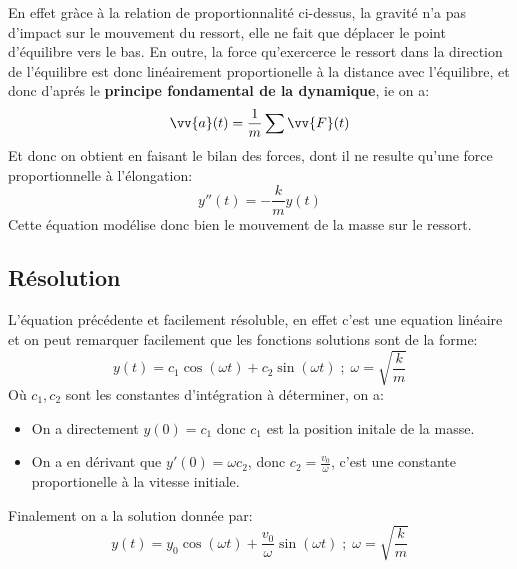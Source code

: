    \begin{center}
   \end{center}
   \pagebreak
   En effet gràce à la relation de proportionnalité ci-dessus, la gravité n'a pas d'impact sur le mouvement du ressort, elle ne fait que déplacer le point d'équilibre vers le bas. En outre, la force qu'exercerce le ressort dans la direction de l'équilibre est donc linéairement proportionelle à la distance avec l'équilibre, et donc d'aprés le \textbf{principe fondamental de la dynamique}, ie on a:
   \[
      \vv{a}(t) = \frac{1}{m}\sum \vv{F}(t)
   \]
   Et donc on obtient en faisant le bilan des forces, dont il ne resulte qu'une force proportionnelle à l'élongation:
   \[
      \boxed{y''(t) = -\frac{k}{m}y(t)}
   \]
   Cette équation modélise donc bien le mouvement de la masse sur le ressort.
   \subsection{Résolution}
      L'équation précédente et facilement résoluble, en effet c'est une equation linéaire et on peut remarquer facilement que les fonctions solutions sont de la forme:
      \[
         y(t) = c_1\cos(\omega t) + c_2\sin(\omega t) \; ; \; \omega = \sqrt{\frac{k}{m}}
      \]
      Où \(c_1, c_2\) sont les constantes d'intégration à déterminer, on a:
      \begin{itemize}
         \item On a directement \(y(0) = c_1\) donc \(c_1\) est la position initale de la masse.
         \item On a en dérivant que \(y'(0) = \omega c_2\), donc \(c_2 = \frac{v_0}{\omega}\), c'est une constante proportionelle à la vitesse initiale.
      \end{itemize}
      Finalement on a la solution donnée par:
      \[
         \boxed{y(t) = y_0\cos(\omega t) + \frac{v_0}{\omega}\sin(\omega t) \; ; \; \omega = \sqrt{\frac{k}{m}}}
      \]
